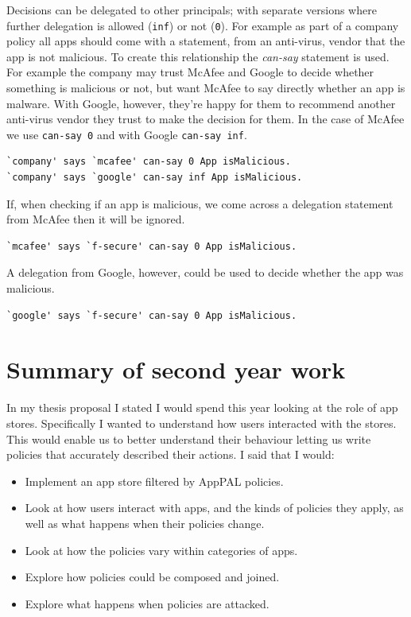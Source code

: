 \documentclass[a4paper]{scrartcl}
\begin{document}
Decisions can be delegated to other principals; with separate versions where further delegation is allowed (\lstinline{inf}) or not (\lstinline{0}).
For example as part of a company policy all apps should come with a statement, from an anti-virus, vendor that the app is not malicious.
To create this relationship the \emph{can-say} statement is used.
For example the company may trust McAfee and Google to decide whether something is malicious or not, but want McAfee to say directly whether an app is malware.
With Google, however, they're happy for them to recommend another anti-virus vendor they trust to make the decision for them.
In the case of McAfee we use \lstinline{can-say 0} and with Google \lstinline{can-say inf}.
\begin{lstlisting}
`company' says `mcafee' can-say 0 App isMalicious.
`company' says `google' can-say inf App isMalicious.
\end{lstlisting}
If, when checking if an app is malicious, we come across a delegation statement from McAfee then it will be ignored.
\begin{lstlisting}
`mcafee' says `f-secure' can-say 0 App isMalicious.
\end{lstlisting}
A delegation from Google, however, could be used to decide whether the app was malicious.
\begin{lstlisting}
`google' says `f-secure' can-say 0 App isMalicious.
\end{lstlisting}

\section{Summary of second year work}


In my thesis proposal I stated I would spend this year looking at the role of app stores.
Specifically I wanted to understand how users interacted with the stores.
This would enable us to better understand their behaviour letting us write policies that accurately described their actions.
I said that I would:
\begin{itemize}
  \item Implement an app store filtered by AppPAL policies.
  \item Look at how users interact with apps, and the kinds of policies they apply, as well as what happens when their policies change.
  \item Look at how the policies vary within categories of apps.
  \item Explore how policies could be composed and joined.
  \item Explore what happens when policies are attacked.
\end{itemize}
\end{document}
